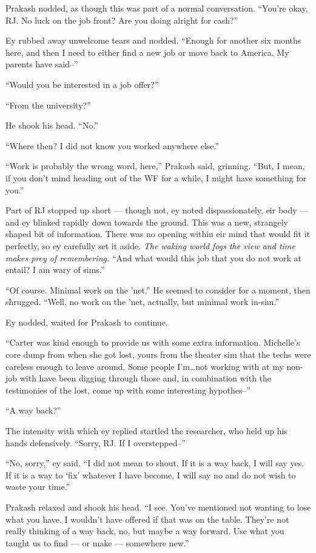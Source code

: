 Prakash nodded, as though this was part of a normal conversation. ``You're okay, RJ. No luck on the job front? Are you doing alright for cash?''

Ey rubbed away unwelcome tears and nodded. ``Enough for another six months here, and then I need to either find a new job or move back to America. My parents have said--''

``Would you be interested in a job offer?''

``From the university?''

He shook his head. ``No.''

``Where then? I did not know you worked anywhere else.''

``Work is probably the wrong word, here,'' Prakash said, grinning. ``But, I mean, if you don't mind heading out of the WF for a while, I might have something for you.''

Part of RJ stopped up short — though not, ey noted dispassionately, eir body — and ey blinked rapidly down towards the ground. This was a new, strangely shaped bit of information. There was no opening within eir mind that would fit it perfectly, so ey carefully set it aside. \emph{The waking world fogs the view and time makes prey of remembering.} ``And what would this job that you do not work at entail? I am wary of sims.''

``Of course. Minimal work on the 'net.'' He seemed to consider for a moment, then shrugged. ``Well, no work on the 'net, actually, but minimal work in-sim.''

Ey nodded, waited for Prakash to continue.

``Carter was kind enough to provide us with some extra information. Michelle's core dump from when she got lost, yours from the theater sim that the techs were careless enough to leave around. Some people I'm\ldots not working with at my non-job with have been digging through those and, in combination with the testimonies of the lost, come up with some interesting hypothes--''

``A way back?''

The intensity with which ey replied startled the researcher, who held up his hands defensively. ``Sorry, RJ. If I overstepped--''

``No, sorry,'' ey said. ``I did not mean to shout. If it is a way back, I will say yes. If it is a way to `fix' whatever I have become, I will say no and do not wish to waste your time.''

Prakash relaxed and shook his head. ``I see. You've mentioned not wanting to lose what you have. I wouldn't have offered if that was on the table. They're not really thinking of a way back, no, but maybe a way forward. Use what you taught us to find — or make — somewhere new.''

